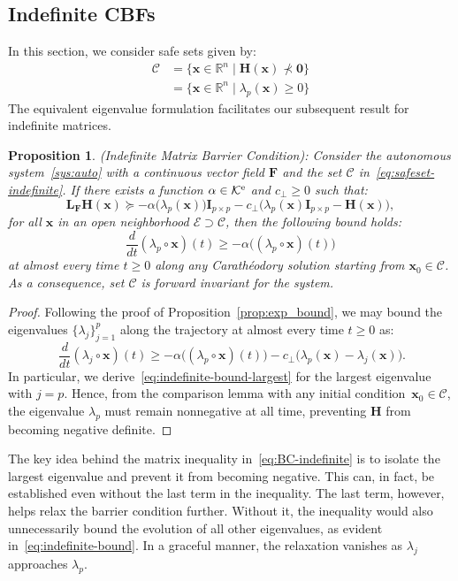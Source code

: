 \documentclass[10pt,twocolumn,twoside]{IEEEtran}
\newcommand{\real}{\mathbb{R}}
\newcommand{\longthmtitle}[1]{\mbox{}{\textit{(#1):}}}
\newcommand{\setdefb}[2]{\big\{#1 \; | \; #2\big\}}
\newcommand{\Cc}{\mathcal{C}}
\newcommand{\Ec}{\mathcal{E}}
\newcommand{\Kc}{\mathcal{K}}
\newcommand{\Ke}{\Kc^{\rm e}}
\newtheorem{proposition}{Proposition}
\theoremstyle{definition}
\newcommand{\bx}{\mathbf{x}}
\newcommand{\bF}{\mathbf{F}}
\newcommand{\bH}{\mathbf{H}}
\newcommand{\bI}{\mathbf{I}}
\newcommand{\bL}{\mathbf{L}}
\newcommand{\bzero}{\mathbf{0}}
\begin{document}
\subsection{Indefinite CBFs}
In this section, we consider safe sets given by:
\begin{align}\label{eq:safeset-indefinite}
    \Cc & = \setdefb{\bx\in\real^n}{\bH(\bx)\not\prec \bzero} \nonumber \\
        & = \setdefb{\bx\in\real^n}{\lambda_p(\bx)\geq 0}
\end{align}
The equivalent eigenvalue formulation facilitates our subsequent result for indefinite matrices.
\begin{proposition}\longthmtitle{Indefinite Matrix Barrier Condition}
    \label{prop:BC-indefinite}
    Consider the autonomous system~\eqref{sys:auto} with a continuous vector field $\bF$  and the set $\Cc$ in~\eqref{eq:safeset-indefinite}. If there exists a function $\alpha\in\Ke$ and $c_\perp \geq 0$ such that:
    \begin{equation}
        \label{eq:BC-indefinite}
        \bL_\bF\bH(\bx) \succeq -\alpha\big(
        \lambda_p(\bx)
        \big)\bI_{p\times p} -c_\perp\big(
        \lambda_p(\bx)\bI_{p\times p}-\bH(\bx)
        \big),
    \end{equation}
    for all $\bx$ in an open neighborhood $\Ec\supset\Cc$, then the following bound holds:
    \begin{equation}\label{eq:indefinite-bound-largest}
        \frac{d}{dt}(\lambda_p\circ \bx)(t) \geq -\alpha\big(
        (\lambda_p\circ\bx)(t)
        \big)
    \end{equation}
    at almost every time $t\geq0$ along any Carath\'eodory solution starting from $\bx_0\in\Cc$. As a consequence, set $\Cc$ is forward invariant for the system.
\end{proposition}
\begin{proof}
    Following the proof of Proposition~\ref{prop:exp_bound}, we may bound the eigenvalues $\{\lambda_j\}_{j=1}^p$ along the trajectory at almost every time $t\geq 0$ as:
    \begin{equation}~\label{eq:indefinite-bound}
        \frac{d}{dt}(\lambda_j\circ \bx)(t) \geq -\alpha\big(
        (\lambda_p\circ\bx)(t)
        \big)-c_\perp\big(
        \lambda_p(\bx)-\lambda_j(\bx)
        \big).
    \end{equation}
    In particular, we derive~\eqref{eq:indefinite-bound-largest} for the largest eigenvalue with $j=p$.
    Hence, from the comparison lemma with any initial condition~$\bx_0\in\Cc$, the eigenvalue $\lambda_p$ must remain nonnegative at all time, preventing $\bH$ from becoming negative definite.
\end{proof}
The key idea behind the matrix inequality in~\eqref{eq:BC-indefinite} is to isolate the largest eigenvalue and prevent it from becoming negative. This can, in fact, be established even without the last term in the inequality. The last term, however, helps relax the barrier condition further. Without it, the inequality would also unnecessarily bound the evolution of all other eigenvalues, as evident in~\eqref{eq:indefinite-bound}. In a graceful manner, the relaxation vanishes as $\lambda_j$ approaches $\lambda_p$.
\end{document}
